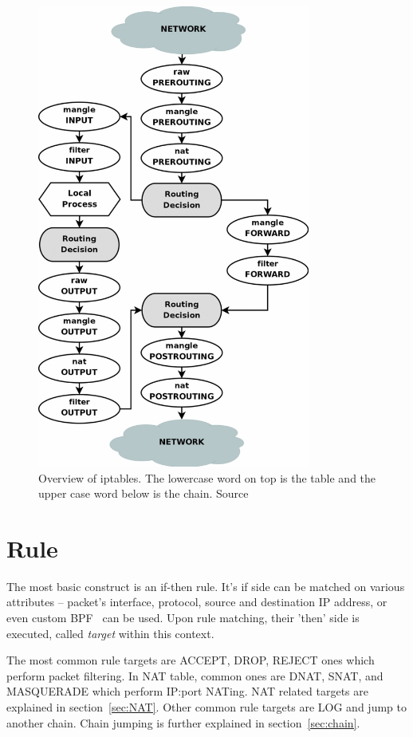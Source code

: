 \documentclass[times, utf8, seminar, english]{fer}
\begin{document}
\begin{figure}
    \centering
    \includegraphics[width=0.8\textwidth]{tables_traverse}
    \caption{Overview of iptables. The lowercase word on top is the table and the upper case word below is the chain. Source~\cite{Iptables99:online}}
    \label{fig:iptables_traverse}
\end{figure}

\section{Rule}
    The most basic construct is an if-then rule. It's if side can be matched on various attributes -- packet's interface, protocol, source and destination IP address, or even custom BPF~\cite{BPFthefo6:online} can be used. Upon rule matching, their 'then' side is executed, called \emph{target} within this context.

    The most common rule targets are ACCEPT, DROP, REJECT ones which perform packet filtering. In NAT table, common ones are DNAT, SNAT, and MASQUERADE which perform IP:port NATing. NAT related targets are explained in section~\ref{sec:NAT}. Other common rule targets are LOG and jump to another chain. Chain jumping is further explained in section~\ref{sec:chain}.
\end{document}
